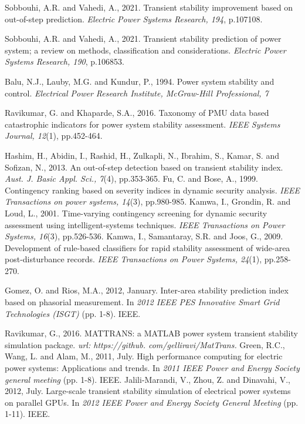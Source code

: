 \begin{thebibliography}{99}
\begin{singlespace}
 Sobbouhi, A.R. and Vahedi, A., 2021. Transient stability improvement based on out-of-step prediction. \textit{Electric Power Systems Research, 194}, p.107108.

 Sobbouhi, A.R. and Vahedi, A., 2021. Transient stability prediction of power system; a review on methods, classification and considerations. \textit{Electric Power Systems Research, 190}, p.106853.

%

%
 Balu, N.J., Lauby, M.G. and Kundur, P., 1994. Power system stability and control. \textit{Electrical Power Research Institute, McGraw-Hill Professional, 7}

 Ravikumar, G. and Khaparde, S.A., 2016. Taxonomy of PMU data based catastrophic indicators for power system stability assessment. \textit{IEEE Systems Journal, 12}(1), pp.452-464.

 Hashim, H., Abidin, I., Rashid, H., Zulkapli, N., Ibrahim, S., Kamar, S. and Sofizan, N., 2013. An out-of-step detection based on transient stability index. \textit{Aust. J. Basic Appl. Sci., 7}(4), pp.353-365.
%
 Fu, C. and Bose, A., 1999. Contingency ranking based on severity indices in dynamic security analysis. \textit{IEEE Transactions on power systems, 14}(3), pp.980-985.
%
 Kamwa, I., Grondin, R. and Loud, L., 2001. Time-varying contingency screening for dynamic security assessment using intelligent-systems techniques. \textit{IEEE Transactions on Power Systems, 16}(3), pp.526-536.
%
 Kamwa, I., Samantaray, S.R. and Joos, G., 2009. Development of rule-based classifiers for rapid stability assessment of wide-area post-disturbance records. \textit{IEEE Transactions on Power Systems, 24}(1), pp.258-270.

 Gomez, O. and Rios, M.A., 2012, January. Inter-area stability prediction index based on phasorial measurement. In \textit{2012 IEEE PES Innovative Smart Grid Technologies (ISGT) }(pp. 1-8). IEEE.
%

 Ravikumar, G., 2016. MATTRANS: a MATLAB power system transient stability simulation package. \textit{url: https://github. com/gelliravi/MatTrans.}
%
 Green, R.C., Wang, L. and Alam, M., 2011, July. High performance computing for electric power systems: Applications and trends. In \textit{2011 IEEE Power and Energy Society general meeting} (pp. 1-8). IEEE.
%
 Jalili-Marandi, V., Zhou, Z. and Dinavahi, V., 2012, July. Large-scale transient stability simulation of electrical power systems on parallel GPUs. In \textit{2012 IEEE Power and Energy Society General Meeting }(pp. 1-11). IEEE.
%
%
%
%
%
%
%
%
%
%
%
%
%
%
%
\end{singlespace}

\end{thebibliography}